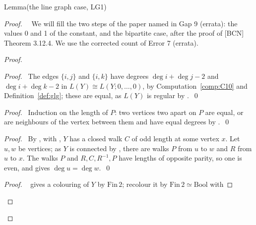 \begin{namedresult}{Lemma}{(the line graph case, LG1)}\label{lem:4-LG1}
\end{namedresult}
\begin{proof}
 \pfsketch\ \repair\ We will fill the two steps of the paper named in Gap 9 (errata): the values
 0 and 1 of the constant, and the bipartite case, after the proof of [BCN] Theorem 3.12.4. We
 use the corrected count of Error 7 (errata).
 \begin{proof}
  \begin{proof}\pf\ The edges $\{i,j\}$ and $\{i,k\}$ have degrees $\deg i+\deg j-2$ and $\deg
   i+\deg k-2$ in $L(Y)\cong L(Y;0,\dots,0)$, by Computation~\ref{comp:C10} and
   Definition~\ref{def:glg}; these are equal, as $L(Y)$ is regular by .~\qed\end{proof}
  \begin{proof}\pf\ Induction on the length of $P$: two vertices two apart on $P$ are equal, or
   are neighbours of the vertex between them and have equal degrees by
   .~\qed\end{proof}
  \begin{proof}\pf\ By , with
   , $Y$ has a closed walk $C$ of odd length at some vertex $x$. Let
   $u,w$ be vertices; as $Y$ is connected by , there are walks $P$ from $u$ to $w$ and
   $R$ from $u$ to $x$. The walks $P$ and $R,C,R^{-1},P$ have lengths of opposite parity, so one
   is even, and  gives $\deg u=\deg w$.~\qed\end{proof}
  \begin{proof}\pf\  gives a colouring of $Y$ by
   $\mathrm{Fin}\,2$; recolour it by $\mathrm{Fin}\,2\simeq\mathrm{Bool}$ with

\end{proof}
\end{proof}
\end{proof}
